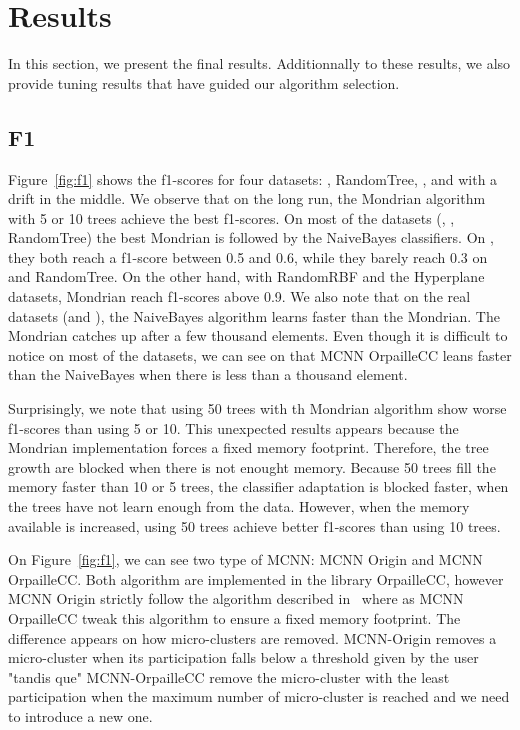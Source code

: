 \section{Results}
In this section, we present the final results. Additionnally to these results,
we also provide tuning results that have guided our algorithm selection.

\subsection{F1}
Figure~\ref{fig:f1} shows the f1-scores for four datasets: \banosdataset,
RandomTree, \recofitdataset, and \banosdataset with a drift in the middle.  We
observe that on the long run, the Mondrian algorithm with 5 or 10 trees achieve
the best f1-scores.  On most of the datasets (\banosdataset, \recofitdataset,
RandomTree) the best Mondrian is followed by the NaiveBayes classifiers.  On
\banosdataset, they both reach a f1-score between 0.5 and 0.6, while they
barely reach 0.3 on \recofitdataset and RandomTree. On the other hand, with
RandomRBF and the Hyperplane datasets, Mondrian reach f1-scores above 0.9.
We also note that on the real datasets (\banosdataset and \recofitdataset), the
NaiveBayes algorithm learns faster than the Mondrian. The Mondrian catches up
after a few thousand elements. Even though it is difficult to notice on most of
the datasets, we can see on \banosdataset that MCNN OrpailleCC leans faster
than the NaiveBayes when there is less than a thousand element.

Surprisingly, we note that using 50 trees with th Mondrian algorithm show worse
f1-scores than using 5 or 10. This unexpected results appears because the
Mondrian implementation forces a fixed memory footprint. Therefore, the tree
growth are blocked when there is not enought memory. Because 50 trees fill the
memory faster than 10 or 5 trees, the classifier adaptation is blocked faster,
when the trees have not learn enough from the data. However, when the memory
available is increased, using 50 trees achieve better f1-scores than using 10
trees.

On Figure~\ref{fig:f1}, we can see two type of MCNN: MCNN Origin and MCNN
OrpailleCC. Both algorithm are implemented in the library OrpailleCC, however
MCNN Origin strictly follow the algorithm described in~\cite{mc-nn} where as
MCNN OrpailleCC tweak this algorithm to ensure a fixed memory footprint. The
difference appears on how micro-clusters are removed. MCNN-Origin removes a
micro-cluster when its participation falls below a threshold given by the user
"tandis que" MCNN-OrpailleCC remove the micro-cluster with the least
participation when the maximum number of micro-cluster is reached and we need
to introduce a new one.

